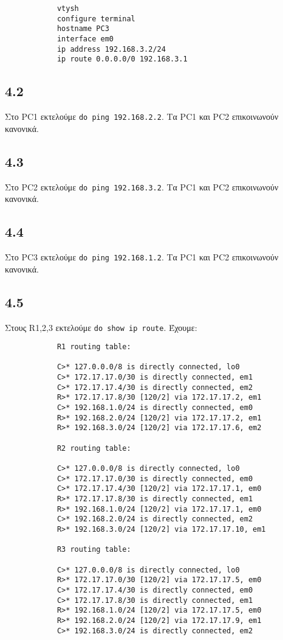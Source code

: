 \documentclass[a4paper, 12pt]{article}
\begin{document}
		\begin{verbatim}
			vtysh
			configure terminal
			hostname PC3
			interface em0
			ip address 192.168.3.2/24
			ip route 0.0.0.0/0 192.168.3.1
		\end{verbatim}

	\subsection*{4.2}
		Στο PC1 εκτελούμε \verb|do ping 192.168.2.2|. Τα PC1 και PC2 επικοινωνούν κανονικά.

	\subsection*{4.3}
		Στο PC2 εκτελούμε \verb|do ping 192.168.3.2|. Τα PC1 και PC2 επικοινωνούν κανονικά.

	\subsection*{4.4}
		Στο PC3 εκτελούμε \verb|do ping 192.168.1.2|. Τα PC1 και PC2 επικοινωνούν κανονικά.

	\subsection*{4.5}
		Στους R1,2,3 εκτελούμε \verb|do show ip route|. Έχουμε:
		
		\begin{verbatim}
			R1 routing table:
			
			C>* 127.0.0.0/8 is directly connected, lo0
			C>* 172.17.17.0/30 is directly connected, em1
			C>* 172.17.17.4/30 is directly connected, em2
			R>* 172.17.17.8/30 [120/2] via 172.17.17.2, em1
			C>* 192.168.1.0/24 is directly connected, em0
			R>* 192.168.2.0/24 [120/2] via 172.17.17.2, em1
			R>* 192.168.3.0/24 [120/2] via 172.17.17.6, em2
			
			R2 routing table:
			
			C>* 127.0.0.0/8 is directly connected, lo0
			C>* 172.17.17.0/30 is directly connected, em0
			C>* 172.17.17.4/30 [120/2] via 172.17.17.1, em0
			R>* 172.17.17.8/30 is directly connected, em1
			R>* 192.168.1.0/24 [120/2] via 172.17.17.1, em0
			C>* 192.168.2.0/24 is directly connected, em2
			R>* 192.168.3.0/24 [120/2] via 172.17.17.10, em1

			R3 routing table:
			
			C>* 127.0.0.0/8 is directly connected, lo0
			R>* 172.17.17.0/30 [120/2] via 172.17.17.5, em0
			C>* 172.17.17.4/30 is directly connected, em0
			C>* 172.17.17.8/30 is directly connected, em1
			R>* 192.168.1.0/24 [120/2] via 172.17.17.5, em0
			R>* 192.168.2.0/24 [120/2] via 172.17.17.9, em1
			C>* 192.168.3.0/24 is directly connected, em2
		\end{verbatim}
\end{document}
